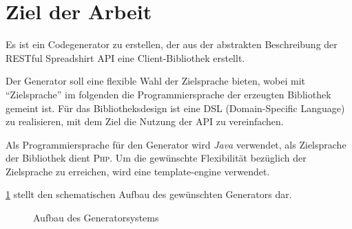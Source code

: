 \section{Ziel der Arbeit}

Es ist ein Codegenerator zu erstellen, der aus der abstrakten Beschreibung der \gls{RESTful} Spreadshirt \gls{API} eine Client-Bibliothek erstellt. 

Der Generator soll eine flexible Wahl der Zielsprache bieten, wobei mit \enquote{Zielsprache} im folgenden die Programmiersprache der erzeugten Bibliothek gemeint ist. 
Für das Bibliotheksdesign ist eine \gls{DSL} (Domain-Specific Language) zu realisieren, mit dem Ziel die Nutzung der \gls{API} zu vereinfachen. 

Als Programmiersprache für den Generator wird \emph{Java} verwendet, als Zielsprache der Bibliothek dient \textsc{Php}. Um die gewünschte Flexibilität bezüglich der Zielsprache zu erreichen, wird eine \gls{template-engine} verwendet.

\cref{fig:generatorstructure} stellt den schematischen Aufbau des gewünschten Generators dar.

\begin{figure}[tb]
    \centering
    \resizebox{\textwidth}{!}{
        
    }
    \caption{Aufbau des Generatorsystems}
    \label{fig:generatorstructure}
\end{figure}        